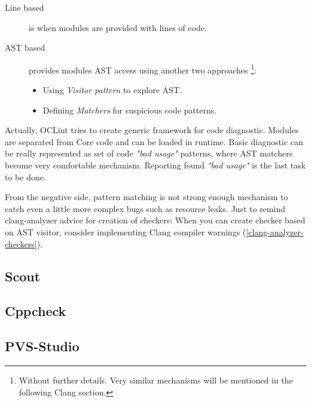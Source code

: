 \begin{description}
\item[Line based] is when modules are provided with lines of code.
\item[AST based] provides modules AST access using another two approaches  \footnote{Without further details. Very similar mechanisms will be mentioned in the following Clang section.}:
	\begin{itemize}
	\item Using \emph{Visitor pattern} to explore AST.
	\item Defining \emph{Matchers} for suspicious code patterns.
	\end{itemize}
\end{description}

Actually, OCLint tries to create generic framework for code diagnostic. Modules are separated from Core code and can be loaded in runtime. Basic diagnostic can be really represented as set of code \textit{"bad usage"} patterns, where AST matchers become very comfortable mechanism. Reporting found \textit{"bad usage"} is the last task to be done.

From the negative side, pattern matching is not strong enough mechanism to catch even a little more complex bugs such as resource leaks. Just to remind clang-analyzer advice for creation of checkers: When you can create checker based on AST visitor, consider implementing Clang compiler warnings (\ref{clang-analyzer-checkers}).

\subsection{Scout}

\subsection{Cppcheck}

\subsection{PVS-Studio}


